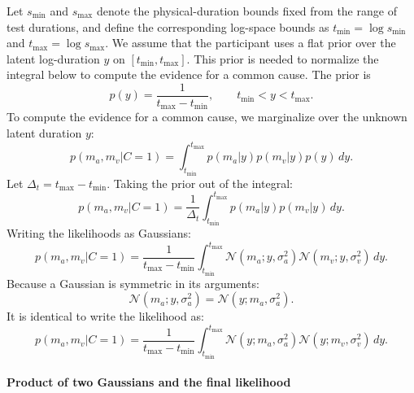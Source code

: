 \documentclass{jov}
\begin{document}
Let $s_{\min}$ and $s_{\max}$ denote the physical-duration bounds fixed from the range of test durations, and define the corresponding log-space bounds as $t_{\min}=\log s_{\min}$ and $t_{\max}=\log s_{\max}$. We assume that the participant uses a flat prior over the latent log-duration $y$ on $[t_{\min},t_{\max}]$. This prior is needed to normalize the integral below to compute the evidence for a common cause. The prior is
\begin{equation}
p(y) = \frac{1}{t_{\max} - t_{\min}},
\qquad t_{\min}<y<t_{\max}.
\end{equation}
To compute the evidence for a common cause, we marginalize over the unknown latent duration $y$:
\begin{equation}
\label{eq:likelihood_c1_integral}
p(m_a, m_v | C=1) = \int_{t_{\min}}^{t_{\max}} p(m_a | y) p(m_v | y) p(y) \, dy.
\end{equation}
Let $\Delta_t = t_{\max} - t_{\min}$. Taking the prior out of the integral:
\begin{equation}
p(m_a, m_v | C=1)
= \frac{1}{\Delta_t} \int_{t_{\min}}^{t_{\max}} p(m_a | y) p(m_v | y) \, dy.
\end{equation}
Writing the likelihoods as Gaussians:
\begin{equation}
p(m_a, m_v | C=1) = \frac{1}{t_{\max} - t_{\min}} \int_{t_{\min}}^{t_{\max}} \mathcal{N}(m_a; y, \sigma_a^2) \mathcal{N}(m_v; y, \sigma_v^2) \, dy.
\end{equation}
Because a Gaussian is symmetric in its arguments:
\begin{equation}
\mathcal{N}(m_a; y, \sigma_a^2) = \mathcal{N}(y; m_a, \sigma_a^2).
\end{equation}
It is identical to write the likelihood as:
\begin{equation}
p(m_a, m_v | C=1) = \frac{1}{t_{\max} - t_{\min}} \int_{t_{\min}}^{t_{\max}} \mathcal{N}(y; m_a, \sigma_a^2) \mathcal{N}(y; m_v, \sigma_v^2) \, dy.
\end{equation}

\paragraph{Product of two Gaussians and the final likelihood}
\end{document}

